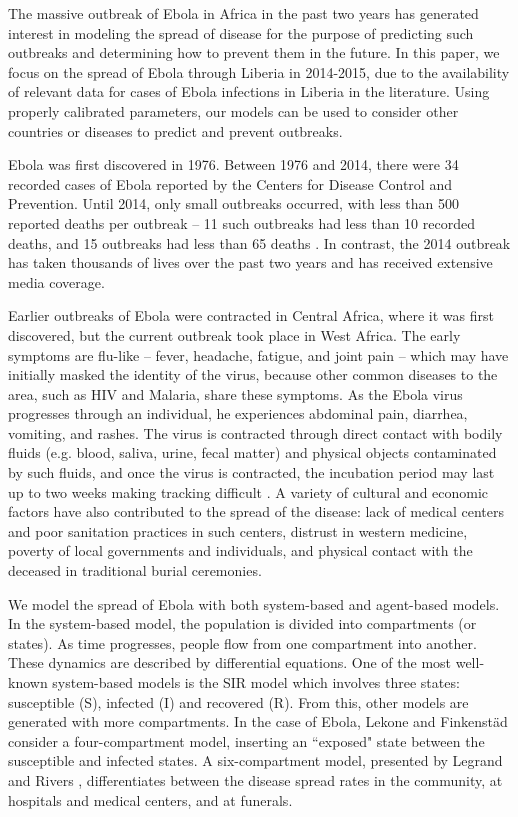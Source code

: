 The massive outbreak of Ebola in Africa in the past two years has generated interest in modeling the spread of disease for the purpose of predicting such outbreaks and determining how to prevent them in the future. In this paper, we focus on the spread of Ebola through Liberia in 2014-2015, due to the availability of relevant data for cases of Ebola infections in Liberia in the literature. Using properly calibrated parameters, our models can be used to consider other countries or diseases to predict and prevent outbreaks.

Ebola was first discovered in 1976. Between 1976 and 2014, there were 34 recorded cases of Ebola reported by the Centers for Disease Control and Prevention. Until 2014, only small outbreaks occurred, with less than 500 reported deaths per outbreak -- 11 such outbreaks had less than 10 recorded deaths, and 15 outbreaks had less than 65 deaths \cite{CDCOutbreaks}. In contrast, the 2014 outbreak has taken thousands of lives over the past two years and has received extensive media coverage.

Earlier outbreaks of Ebola were contracted in Central Africa, where it was first discovered, but the current outbreak took place in West Africa. The early symptoms are flu-like -- fever, headache, fatigue, and joint pain -- which may have initially masked the identity of the virus, because other common diseases to the area, such as HIV and Malaria, share these symptoms. As the Ebola virus progresses through an individual, he experiences abdominal pain, diarrhea, vomiting, and rashes. The virus is contracted through direct contact with bodily fluids (e.g. blood, saliva, urine, fecal matter) and physical objects contaminated by such fluids, and once the virus is contracted, the incubation period may last up to two weeks making tracking difficult \cite{CDCSympt}. A variety of cultural and economic factors have also contributed to the spread of the disease: lack of medical centers and poor sanitation practices in such centers, distrust in western medicine, poverty of local governments and individuals, and physical contact with the deceased in traditional burial ceremonies\cite{WHOReasons}.

We model the spread of Ebola with both system-based and agent-based models. In the system-based model, the population is divided into compartments (or states). As time progresses, people flow from one compartment into another. These dynamics are described by differential equations. One of the most well-known system-based models is the SIR model which involves three states: susceptible (S), infected (I) and recovered (R). From this, other models are generated with more compartments. In the case of Ebola, Lekone and Finkenstäd \cite{Lekone2006} consider a four-compartment model, inserting an ``exposed" state between the susceptible and infected states. A six-compartment model, presented by Legrand \cite{Legrand2007} and Rivers \cite{Rivers2014}, differentiates between the disease spread rates in the community, at hospitals and medical centers, and at funerals.


